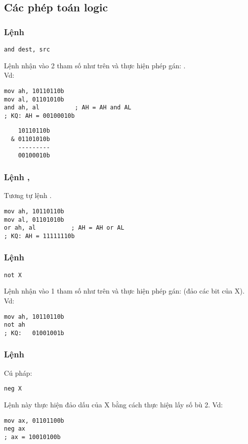 \documentclass[main.tex]{subfiles}
\begin{document}
\subsection{Các phép toán logic}
\subsubsection{Lệnh }
\begin{verbatim}
and dest, src
\end{verbatim}
Lệnh  nhận vào 2 tham số như trên và thực hiện phép gán: .\\
Vd:
\begin{verbatim}
mov ah, 10110110b
mov al, 01101010b
and ah, al          ; AH = AH and AL 
; KQ: AH = 00100010b
\end{verbatim}
\begin{verbatim}
    10110110b
  & 01101010b
    ---------
    00100010b
\end{verbatim}

\subsubsection{Lệnh , }
Tương tự lệnh .
\begin{verbatim}
mov ah, 10110110b
mov al, 01101010b
or ah, al          ; AH = AH or AL 
; KQ: AH = 11111110b
\end{verbatim}

\subsubsection{Lệnh }
\begin{verbatim}
not X
\end{verbatim}
Lệnh  nhận vào 1 tham số như trên và thực hiện phép gán:  (đảo các bit của \cd X).
Vd:
\begin{verbatim}
mov ah, 10110110b
not ah
; KQ:   01001001b
\end{verbatim}

\subsubsection{Lệnh }
Cú pháp:
\begin{verbatim}
neg X
\end{verbatim}
Lệnh này thực hiện đảo dấu của X bằng cách thực hiện lấy số bù 2.
Vd:
\begin{verbatim}
mov ax, 01101100b
neg ax 
; ax = 10010100b
\end{verbatim}
\end{document}
